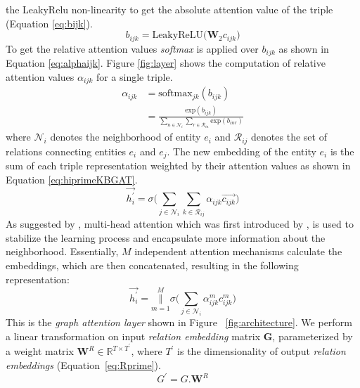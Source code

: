 \documentclass[11pt,a4paper]{article}
\begin{document}
the LeakyRelu non-linearity to get the absolute attention value of the triple (Equation \ref{eq:bijk}).
\begin{equation}\label{eq:bijk}
 b_{ijk} = \textrm{LeakyReLU} \Big( \textbf{W}_{2} c_{ijk} \Big)
\end{equation}
To get the relative attention values \emph{softmax} is applied over \(b_{ijk}\) as shown in Equation \ref{eq:alphaijk}. Figure \ref{fig:layer} shows the computation of relative attention values \(\alpha_{ijk}\) for a single triple.
\begin{align}
\label{eq:alphaijk}
 \alpha_{ijk} &= \textrm{softmax}_{jk} (b_{ijk}) \\ \nonumber
 &= \frac{\textrm{exp} (b_{ijk})}{\sum_{n \in \mathcal{N}_{i}} \sum_{r \in \mathcal{R}_{in}} \textrm{exp} (b_{inr})}
\end{align}
where \(\mathcal{N}_i\) denotes the neighborhood of entity \(e_i\) and \(\mathcal{R}_{ij}\) denotes the set of relations connecting entities \(e_i\) and \(e_j\).
The new embedding of the entity \(e_i\) is the sum of each triple representation weighted by their attention values as shown in Equation \ref{eq:hiprimeKBGAT}.
\begin{equation}\label{eq:hiprimeKBGAT}
  \vec{h_{i}^{\prime}} = \sigma \Bigg( \sum_{j \in \mathcal{N}_{i}} \sum_{k \in \mathcal{R}_{ij}} \alpha_{ijk} \vec{c_{ijk}} \Bigg)
\end{equation}
As suggested by \cite{velickovic2018graph}, multi-head attention which was first introduced by \cite{NIPS2017_7181}, is used to stabilize the learning process and encapsulate more information about the neighborhood. Essentially, \(M\) independent attention mechanisms calculate the embeddings, which are then concatenated, resulting in the following representation: 
\begin{equation}\label{eq:sumhiprime}
 \vec{h_{i}^{\prime}} = \underset{m=1}{\stackrel{M}{\Big \Vert}}  \sigma \Bigg( \sum_{j \in \mathcal{N}_{i}} \alpha_{ijk}^{m} c_{ijk}^{m} \Bigg)
\end{equation}
This is the \emph{graph attention layer} shown in Figure ~\ref{fig:architecture}.
We perform a linear transformation on input \emph{relation embedding} matrix \(\textbf{G}\), parameterized by a weight matrix \(\textbf{W}^R \in \mathbb{R}^{T \times T^\prime}\), where \(T^\prime\) is the dimensionality of output \emph{relation embeddings} (Equation~\ref{eq:Rprime}).
\begin{equation}\label{eq:Rprime}
 G^{\prime} = G.\textbf{W}^{R}
\end{equation}
\end{document}
